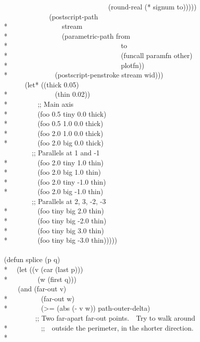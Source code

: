 \begin{new}
\begin{lisp}
~~~~~~~~~~~~~~~~~~~~~~~~~~~~~~(round-real (* signum to))))) \\
~~~~~~~~~~~~~(postscript-path \\*
~~~~~~~~~~~~~~~stream \\*
~~~~~~~~~~~~~~~(parametric-path from \\*
~~~~~~~~~~~~~~~~~~~~~~~~~~~~~~~~to \\*
~~~~~~~~~~~~~~~~~~~~~~~~~~~~~~~~(funcall paramfn other) \\*
~~~~~~~~~~~~~~~~~~~~~~~~~~~~~~~~plotfn)) \\*
~~~~~~~~~~~~~(postscript-penstroke stream wid))) \\
~~~~~~(let* ((thick 0.05) \\*
~~~~~~~~~~~~~(thin 0.02)) \\*
~~~~~~~~;; Main axis \\*
~~~~~~~~(foo 0.5 tiny 0.0 thick) \\*
~~~~~~~~(foo 0.5 1.0 0.0 thick) \\*
~~~~~~~~(foo 2.0 1.0 0.0 thick) \\*
~~~~~~~~(foo 2.0 big 0.0 thick) \\
~~~~~~~~;; Parallels at 1 and -1 \\*
~~~~~~~~(foo 2.0 tiny 1.0 thin) \\*
~~~~~~~~(foo 2.0 big 1.0 thin) \\*
~~~~~~~~(foo 2.0 tiny -1.0 thin) \\*
~~~~~~~~(foo 2.0 big -1.0 thin) \\
~~~~~~~~;; Parallels at 2, 3, -2, -3 \\*
~~~~~~~~(foo tiny big 2.0 thin) \\*
~~~~~~~~(foo tiny big -2.0 thin) \\*
~~~~~~~~(foo tiny big 3.0 thin) \\*
~~~~~~~~(foo tiny big -3.0 thin))))) \\
\\
(defun splice (p q) \\*
~~(let ((v (car (last p))) \\*
~~~~~~~~(w (first q))) \\
~~~~(and (far-out v) \\*
~~~~~~~~~(far-out w) \\*
~~~~~~~~~(>= (abs (- v w)) path-outer-delta) \\
~~~~~~~~~;; Two far-apart far-out points.~~Try to walk around \\*
~~~~~~~~~;;~~outside the perimeter, in the shorter direction. \\*

\end{lisp}
\end{new}
